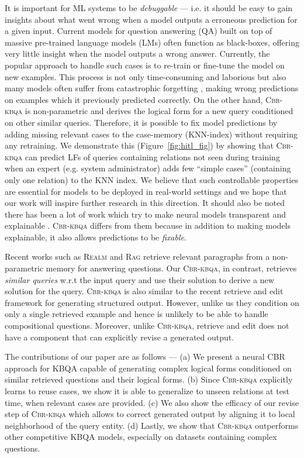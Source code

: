\documentclass{article}
\newcommand{\alg}{\textsc{Cbr-kbqa}\xspace}
\begin{document}
 It is important for ML systems to be \emph{debuggable} --- i.e. it should be easy to gain insights about what went wrong when a model outputs a erroneous prediction for a given input. Current models for question answering (QA) built on top of massive pre-trained language models (LMs)  \cite{liu2019roberta,t5} often function as black-boxes, offering very little insight when the model outputs a wrong answer. Currently, the popular approach to handle such cases is to re-train or fine-tune the model on new examples. This process is not only time-consuming and laborious but also many models often suffer from catastrophic forgetting \cite{hinton1987using,kirkpatrick2017overcoming}, making wrong predictions on examples which it previously predicted correctly. On the other hand, \alg is non-parametric and derives the logical form for a new query conditioned on other similar queries. Therefore, it is possible to fix model predictions by adding missing relevant cases to the case-memory (KNN-index) without requiring any retraining. We demonstrate this (Figure~\ref{fig:hitl_fig}) by showing that \alg can predict LFs of queries containing relations not seen during training when an expert (e.g. system administrator) adds few ``simple cases'' (containing only one relation) to the KNN index. We believe that such controllable properties are essential for models to be deployed in real-world settings and we hope that our work will inspire further research in this direction. It should also be noted there has been a lot of work which try to make neural models transparent and explainable \cite{ribeiro2016should}. \alg differs from them because in addition to making models explainable, it also allows predictions to be \emph{fixable}.


Recent works such as \textsc{Realm} \cite{guu2020realm} and \textsc{Rag} \cite{lewis2020retrieval} retrieve relevant paragraphs from a non-parametric memory for answering questions. Our \alg, in contrast, retrieves \emph{similar queries} w.r.t the input query and use their solution to derive a new solution for the query. \alg is also similar to the recent retrieve and edit framework \cite{hashimoto2018retrieve} for generating structured output. However, unlike us they condition on only a single retrieved example and hence is unlikely to be able to handle compositional questions. Moreover, unlike \alg, retrieve and edit does not have a component that can explicitly revise a generated output.

The contributions of our paper are as follows --- (a) We present a neural CBR approach for KBQA capable of generating complex logical forms conditioned on similar retrieved questions and their logical forms. (b) Since \alg explicitly learns to reuse cases, we show it is able to generalize to unseen relations at test time, when relevant cases are provided. (c) We also show the efficacy of our revise step of \alg which allows to correct generated output by aligning it to local neighborhood of the query entity. (d) Lastly, we show that \alg outperforms other competitive KBQA models, especially on datasets containing complex questions.
\end{document}
